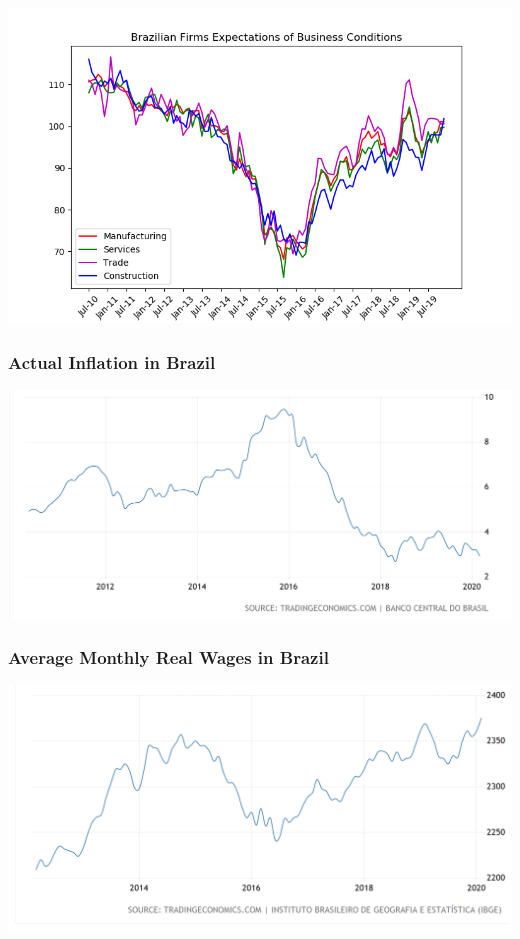 \documentclass{beamer}
\begin{document}
\begin{frame}
		\centering
		\includegraphics[scale=.6]{old_figures/IBRE_Firm_Expectations}
\end{frame}

\begin{frame}
\frametitle{Actual Inflation in Brazil}
	\centering
	\includegraphics[scale=.45]{old_figures/Brazil_Inflation.png}
\end{frame}

\begin{frame}
\frametitle{Average Monthly Real Wages in Brazil}
	\centering
	\includegraphics[scale=.35]{old_figures/Wage_Growth.png}
\end{frame}
\end{document}
